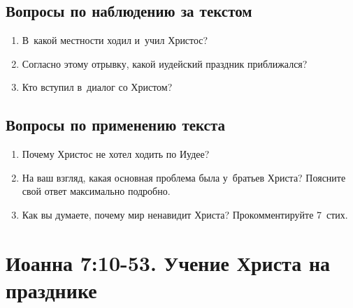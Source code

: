 \documentclass[a4paper,12pt]{article}
\begin{document}
\subsection*{Вопросы по наблюдению за текстом}
\begin{enumerate}
    \item В~какой местности ходил и~учил Христос? 
    
    \myline
    
    \item Согласно этому отрывку, какой иудейский праздник приближался? 
    
    \myline
    
    \item Кто вступил в~диалог со Христом? 
    
    \myline
    
\end{enumerate}

\subsection*{Вопросы по применению текста} 
\begin{enumerate}
    \item Почему Христос не хотел ходить по Иудее? 
    
    \myline
    
    \myline
    \item На ваш взгляд, какая основная проблема была у~братьев Христа? Поясните свой ответ максимально подробно. 
    
    \myline
    
    \myline
    \item Как вы думаете, почему мир ненавидит Христа? Прокомментируйте 7~стих. 
    
    \myline
    
    \myline
\end{enumerate}



\section{Иоанна 7:10-53. Учение Христа на празднике}
\end{document}
